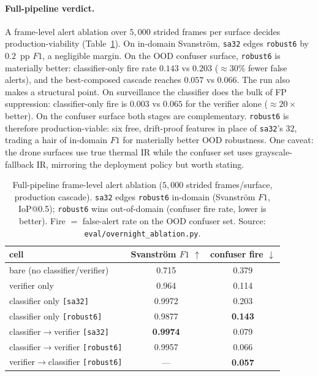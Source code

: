 \paragraph{Full-pipeline verdict.}
A frame-level alert ablation over $5{,}000$ strided frames per surface decides production-viability (Table~\ref{tab:robust6_pipeline}). On in-domain Svanstr\"om, \texttt{sa32} edges \texttt{robust6} by $0.2$~pp $F1$, a negligible margin. On the OOD confuser surface, \texttt{robust6} is materially better: classifier-only fire rate $0.143$ vs $0.203$ (${\approx}30\%$ fewer false alerts), and the best-composed cascade reaches $0.057$ vs $0.066$. The run also makes a structural point. On surveillance the classifier does the bulk of FP suppression: classifier-only fire is $0.003$ vs $0.065$ for the verifier alone (${\approx}20\times$ better). On the confuser surface both stages are complementary. \texttt{robust6} is therefore production-viable: six free, drift-proof features in place of \texttt{sa32}'s $32$, trading a hair of in-domain $F1$ for materially better OOD robustness. One caveat: the drone surfaces use true thermal IR while the confuser set uses grayscale-fallback IR, mirroring the deployment policy but worth stating.

\begin{table}[htbp]
    \centering
    \caption{Full-pipeline frame-level alert ablation ($5{,}000$ strided frames/surface, production cascade). \texttt{sa32} edges \texttt{robust6} in-domain (Svanstr\"om $F1$, IoP@0.5); \texttt{robust6} wins out-of-domain (confuser fire rate, lower is better). Fire $=$ false-alert rate on the OOD confuser set. Source: \texttt{eval/overnight\_ablation.py}.}
    \label{tab:robust6_pipeline}
    \begin{tabular}{lcc}
        \toprule
        cell & Svanstr\"om $F1$ $\uparrow$ & confuser fire $\downarrow$ \\
        \midrule
        bare (no classifier/verifier)        & 0.715 & 0.379 \\
        verifier only                        & 0.964 & 0.114 \\
        classifier only \texttt{[sa32]}      & 0.9972 & 0.203 \\
        classifier only \texttt{[robust6]}   & 0.9877 & \textbf{0.143} \\
        classifier$\to$verifier \texttt{[sa32]}    & \textbf{0.9974} & 0.079 \\
        classifier$\to$verifier \texttt{[robust6]} & 0.9957 & 0.066 \\
        verifier$\to$classifier \texttt{[robust6]} & --- & \textbf{0.057} \\
        \bottomrule
    \end{tabular}
\end{table}

